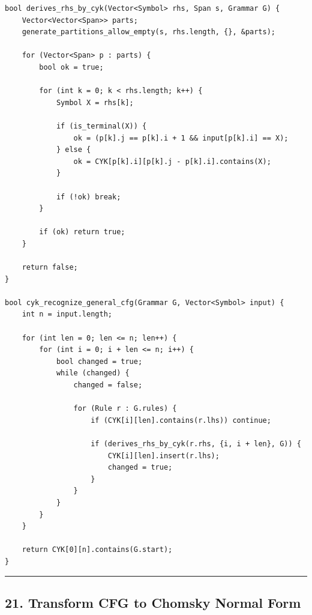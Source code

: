\documentclass[10pt,letterpaper]{article}
\begin{document}
\begin{verbatim}
bool derives_rhs_by_cyk(Vector<Symbol> rhs, Span s, Grammar G) {
    Vector<Vector<Span>> parts;
    generate_partitions_allow_empty(s, rhs.length, {}, &parts);

    for (Vector<Span> p : parts) {
        bool ok = true;

        for (int k = 0; k < rhs.length; k++) {
            Symbol X = rhs[k];

            if (is_terminal(X)) {
                ok = (p[k].j == p[k].i + 1 && input[p[k].i] == X);
            } else {
                ok = CYK[p[k].i][p[k].j - p[k].i].contains(X);
            }

            if (!ok) break;
        }

        if (ok) return true;
    }

    return false;
}

bool cyk_recognize_general_cfg(Grammar G, Vector<Symbol> input) {
    int n = input.length;

    for (int len = 0; len <= n; len++) {
        for (int i = 0; i + len <= n; i++) {
            bool changed = true;
            while (changed) {
                changed = false;

                for (Rule r : G.rules) {
                    if (CYK[i][len].contains(r.lhs)) continue;

                    if (derives_rhs_by_cyk(r.rhs, {i, i + len}, G)) {
                        CYK[i][len].insert(r.lhs);
                        changed = true;
                    }
                }
            }
        }
    }

    return CYK[0][n].contains(G.start);
}
\end{verbatim}

\medskip\hrule\medskip

\subsection*{21. Transform CFG to Chomsky Normal Form}
\end{document}
